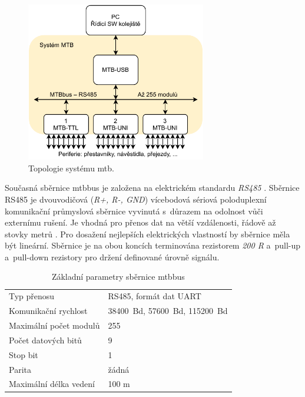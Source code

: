 \begin{figure}[ht]
\includegraphics[width=0.7\textwidth]{data/mtb-topology.pdf}
\caption{Topologie systému \gls{mtb}.}
\label{fig:mtbbus-topology}
\end{figure}

Současná sběrnice \gls{mtbbus} je založena na elektrickém standardu
\textit{RS485} \cite{mtbbus-specs}. Sběrnice RS485 je dvouvodičová (\textit{R+,
R-, GND}) vícebodová sériová poloduplexní komunikační průmyslová sběrnice
vyvinutá s~důrazem na odolnost vůči externímu rušení. Je vhodná pro přenos dat
na větší vzdálenosti, řádově až stovky metrů \cite{rs485-specs}. Pro dosažení
nejlepších elektrických vlastností by sběrnice měla být lineární. Sběrnice je
na obou koncích terminována rezistorem \textit{200 R} a~pull-up a~pull-down
rezistory pro držení definované úrovně signálu.

\begin{table}[h]
	\begin{tabularx}{\textwidth}{XX}
		\toprule
		Typ přenosu & RS485, formát dat UART \\
		Komunikační rychlost & 38400~Bd, 57600~Bd, 115200~Bd \\
		Maximální počet modulů & 255 \\
		Počet datových bitů & 9 \\
		Stop bit & 1 \\
		Parita & žádná \\
		Maximální délka vedení & 100 m \\
		\bottomrule
	\end{tabularx}
	\caption{Základní parametry sběrnice \gls{mtbbus} \cite{mtbbus-specs}}
	\label{tab:mtbbus-params}
\end{table}

